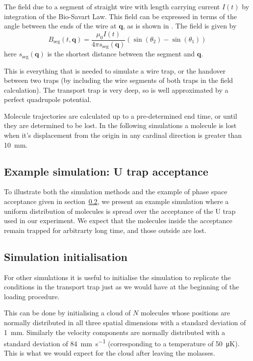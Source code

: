 The field due to a segment of straight wire with length carrying current $I(t)$
 by integration of the Bio-Savart Law.
This field can be expressed in terms of the angle between the ends of the wire
at $\mathbf{q}$, as is shown in . The field
is given by~\cite{Griffiths2017}
%
\begin{equation}
  B_\text{seg}(t, \mathbf{q}) = \frac{\mu_0 I(t)}{4\pi
  s_\text{seg}(\mathbf{q})} (\sin(\theta_2)  - \sin(\theta_1))
\end{equation}
here $s_\text{seg}(\mathbf{q})$ is the shortest distance between the segment
and $\mathbf{q}$.

This is everything that is needed to simulate a wire trap, or the handover
between two traps (by including the wire segments of both traps in the field
calculation). The transport trap is very deep, so is well approximated by a
perfect quadrupole potential.

Molecule trajectories are calculated up to a pre-determined end time, or until
they are determined to be lost. In the following simulations a molecule is lost
when it's displacement from the origin in any cardinal direction is greater
than \SI{10}{\milli\meter}.

\subsection{Example simulation: U trap acceptance}

To illustrate both the simulation methods and the example of phase space
acceptance given in section~\ref{}, we present an example simulation where
a uniform distribution of molecules is spread over the acceptance of the U trap
used in our experiment. We expect that the molecules inside the acceptance
remain trapped for arbitrarty long time, and those outside are lost.





\subsection{Simulation initialisation}

For other simulations it is useful to initialise the simulation to replicate
the conditions in the transport trap just as we would have at the beginning of
the loading procedure.

This can be done by initialising a cloud of $N$ molecules whose positions are
normally distributed in all three spatial dimensions with a standard deviation
of \SI{1}{\milli\meter}. Similarly the velocity components are normally
distributed with a standard deviation of \SI{84}{\milli\meter\per\second}
(corresponding to a temperature of \SI{50}{\micro\kelvin}). This is what we
would expect for the cloud after leaving the molasses.

